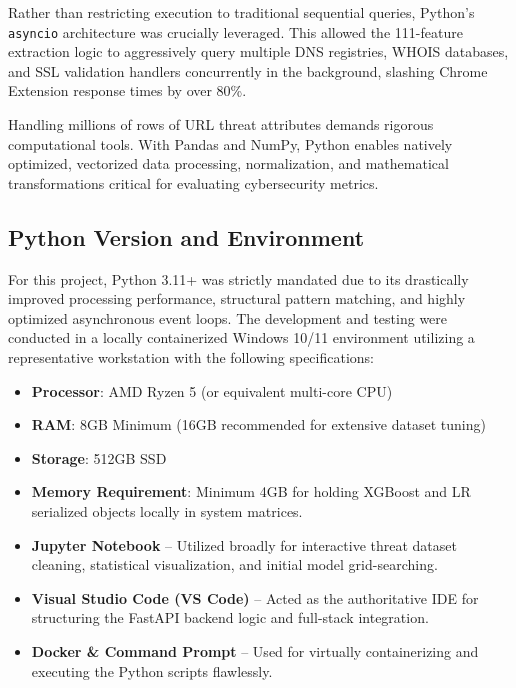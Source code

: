 \noindent
Rather than restricting execution to traditional sequential queries, Python's \texttt{asyncio} architecture was crucially leveraged. This allowed the 111-feature extraction logic to aggressively query multiple DNS registries, WHOIS databases, and SSL validation handlers concurrently in the background, slashing Chrome Extension response times by over 80\%.


\noindent
Handling millions of rows of URL threat attributes demands rigorous computational tools. With Pandas and NumPy, Python enables natively optimized, vectorized data processing, normalization, and mathematical transformations critical for evaluating cybersecurity metrics.

\subsection{Python Version and Environment}

\noindent
For this project, Python 3.11+ was strictly mandated due to its drastically improved processing performance, structural pattern matching, and highly optimized asynchronous event loops. The development and testing were conducted in a locally containerized Windows 10/11 environment utilizing a representative workstation with the following specifications:


\begin{itemize}
\item \textbf{Processor}: AMD Ryzen 5 (or equivalent multi-core CPU)
\item \textbf{RAM}: 8GB Minimum (16GB recommended for extensive dataset tuning)
\item \textbf{Storage}: 512GB SSD
\item \textbf{Memory Requirement}: Minimum 4GB for holding XGBoost and LR serialized objects locally in system matrices.
\end{itemize}


\begin{itemize}
\item \textbf{Jupyter Notebook} -- Utilized broadly for interactive threat dataset cleaning, statistical visualization, and initial model grid-searching.
\item \textbf{Visual Studio Code (VS Code)} -- Acted as the authoritative IDE for structuring the FastAPI backend logic and full-stack integration.
\item \textbf{Docker \& Command Prompt} -- Used for virtually containerizing and executing the Python scripts flawlessly.
\end{itemize}

